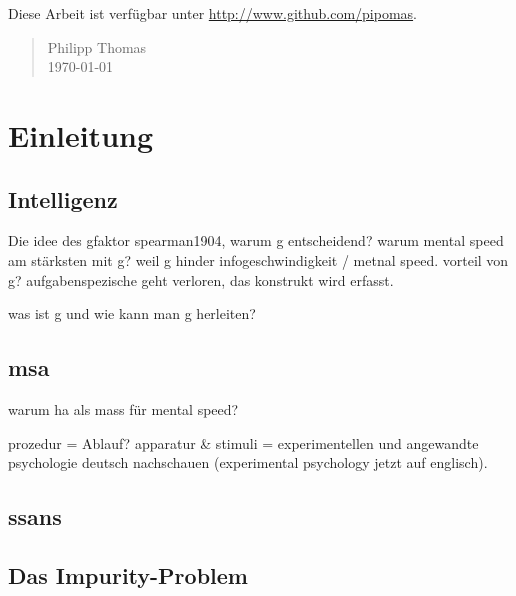 \documentclass[11pt, twoside, a4paper]{book}		%
\begin{document}
Diese Arbeit ist verfügbar unter \url{http://www.github.com/pipomas}.

\vspace{6 mm}

\begin{quote}
Philipp Thomas\\
\today
\end{quote}



\mainmatter
{}		%


\chapter{Einleitung \label{cha:Einleitung}}

\section{Intelligenz \label{sec:Intelligenz}}
Die idee des gfaktor
spearman1904, warum g entscheidend? warum mental speed am stärksten mit g? weil g hinder infogeschwindigkeit / metnal speed.
vorteil von g? aufgabenspezische geht verloren, das konstrukt wird erfasst.

was ist g und wie kann man g herleiten?

\section{\gls{msa} \label{sec:lol}}
warum ha als mass für mental speed?

prozedur = Ablauf?
apparatur \& stimuli = 
experimentellen und angewandte psychologie deutsch nachschauen (experimental psychology jetzt auf englisch).

\citep{Doebler2015}

\section{\gls{ssans} \label{sec:SpatialSuppression}}

\section{Das Impurity-Problem \label{}}
\end{document}
